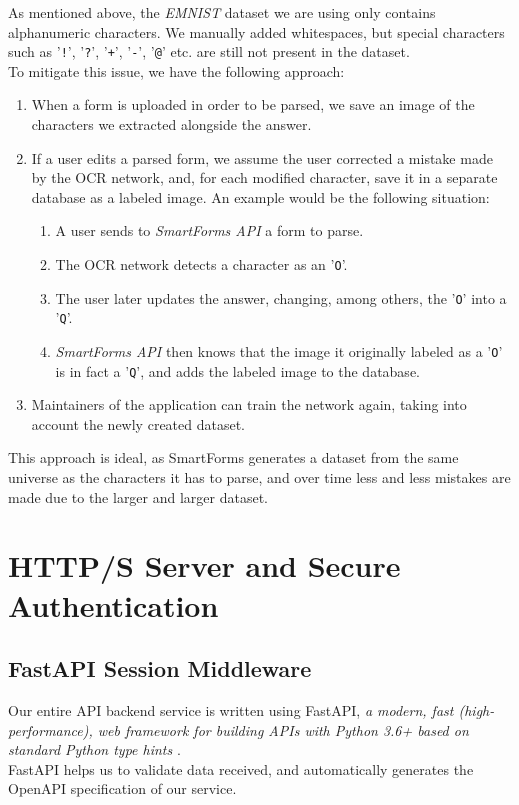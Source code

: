 \documentclass[11pt, a4paper]{report}
\def\code#1{\texttt{#1}}
\begin{document}
As mentioned above, the \textit{EMNIST} dataset we are using only contains alphanumeric characters. We manually added whitespaces, but special characters such as '\code{!}', '\code{?}', '\code{+}', '\code{-}', '\code{@}' etc. are still not present in the dataset.
\\
To mitigate this issue, we have the following approach:
\begin{enumerate}
	\item When a form is uploaded in order to be parsed, we save an image of the characters we extracted alongside the answer.
	\item If a user edits a parsed form, we assume the user corrected a mistake made by the OCR network, and, for each modified character, save it in a separate database as a labeled image. An example would be the following situation:
	\begin{enumerate}
		\item A user sends to \textit{SmartForms API} a form to parse.
		\item The OCR network detects a character as an '\code{O}'.
		\item The user later updates the answer, changing, among others, the '\code{O}' into a '\code{Q}'.
		\item \textit{SmartForms API} then knows that the image it originally labeled as a '\code{O}' is in fact a '\code{Q}', and adds the labeled image to the database.
	\end{enumerate}
	\item Maintainers of the application can train the network again, taking into account the newly created dataset.
\end{enumerate}

This approach is ideal, as SmartForms generates a dataset from the same universe as the characters it has to parse, and over time less and less mistakes are made due to the larger and larger dataset.

\chapter{HTTP/S Server and Secure Authentication}
\label{chapter-https-server}

\section{FastAPI Session Middleware}

Our entire API backend service is written using FastAPI, \textit{a modern, fast (high-performance), web framework for building APIs with Python 3.6+ based on standard Python type hints} \cite{FastAPI}.
\\
FastAPI helps us to validate data received, and automatically generates the OpenAPI \cite{open-api} specification of our service.
\end{document}
